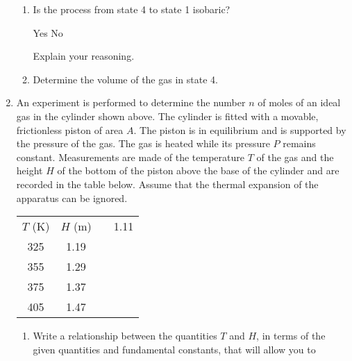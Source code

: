 \documentclass{../../../oss-apphys}
\begin{document}
\begin{enumerate}[leftmargin=15pt]
\begin{enumerate}[leftmargin=18pt]
  \item Is the process from state 4 to state 1 isobaric?

    \vspace{.1in}\underline{\hspace{.3in}}Yes\hspace{.5in}
    \underline{\hspace{.3in}} No

    \vspace{.1in}Explain your reasoning.\vspace{.35in}

  \item Determine the volume of the gas in state 4.\vspace{.35in}
  \end{enumerate}
  
  \begin{center}
  \end{center}
\item\vspace{-.2in}An experiment is performed to determine the number $n$ of
  moles of an
  ideal gas in the cylinder shown above. The cylinder is fitted with a movable,
  frictionless piston of area $A$. The piston is in equilibrium and is supported
  by the pressure of the gas. The gas is heated while its pressure $P$ remains
  constant. Measurements are made of the temperature $T$ of the gas and the
  height $H$ of the bottom of the piston above the base of the cylinder and are
  recorded in the table below. Assume that the thermal expansion of the
  apparatus can be ignored.
  \begin{center}
    \begin{tabular}{|c|c|}
      \hline
      $T$ (\si{\kelvin}) & $H$ (\si{\metre}) &
      \hline{} & 1.11 \\
      325 & 1.19 \\
      355 & 1.29 \\
      375 & 1.37 \\
      405 & 1.47 \\
      \hline
    \end{tabular}
  \end{center}
  \begin{enumerate}[leftmargin=18pt]
  \item Write a relationship between the quantities $T$ and $H$, in terms of
    the given quantities and fundamental constants, that will allow you to

\end{enumerate}
\end{enumerate}
\end{document}
